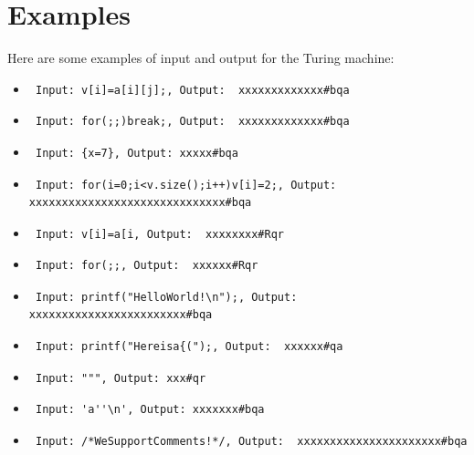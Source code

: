 \documentclass{article}
\begin{document}
\section{Examples}
Here are some examples of input and output for the Turing machine:
\begin{itemize}
    \item \begin{verbatim} Input: v[i]=a[i][j];, Output:  xxxxxxxxxxxxx#bqa \end{verbatim}
    \item \begin{verbatim} Input: for(;;)break;, Output:  xxxxxxxxxxxxx#bqa \end{verbatim}
    \item \begin{verbatim} Input: {x=7}, Output: xxxxx#bqa \end{verbatim}
    \item \begin{verbatim} Input: for(i=0;i<v.size();i++)v[i]=2;, Output: xxxxxxxxxxxxxxxxxxxxxxxxxxxxxx#bqa \end{verbatim}
    \item \begin{verbatim} Input: v[i]=a[i, Output:  xxxxxxxx#Rqr \end{verbatim}
    \item \begin{verbatim} Input: for(;;, Output:  xxxxxx#Rqr \end{verbatim}
    \item \begin{verbatim} Input: printf("HelloWorld!\n");, Output:   xxxxxxxxxxxxxxxxxxxxxxxx#bqa \end{verbatim}
    \item \begin{verbatim} Input: printf("Hereisa{(");, Output:  xxxxxx#qa\end{verbatim}
    \item \begin{verbatim} Input: """, Output: xxx#qr\end{verbatim}
    \item \begin{verbatim} Input: 'a''\n', Output: xxxxxxx#bqa\end{verbatim}
    \item \begin{verbatim} Input: /*WeSupportComments!*/, Output:  xxxxxxxxxxxxxxxxxxxxxx#bqa \end{verbatim}

\end{itemize}
\end{document}
